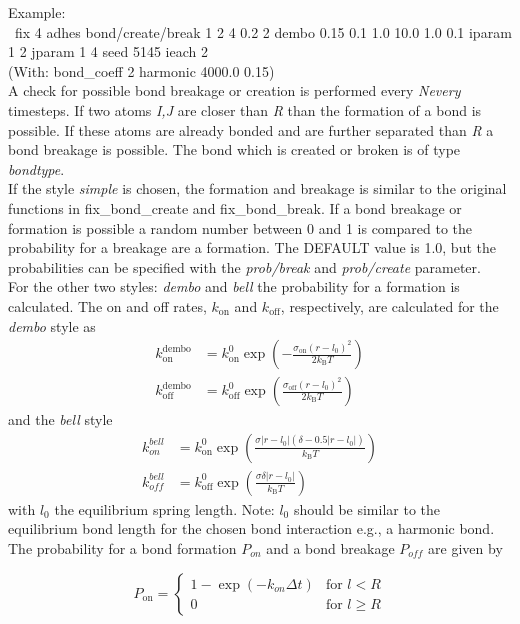 Example:\\[0.5ex]
\
fix             4 adhes bond/create/break 1 2 4 0.2 2 dembo 0.15 0.1 1.0 10.0 1.0 0.1 iparam 1 2 jparam 1 4 seed 5145 ieach 2\\
(With: bond\_coeff      2 harmonic 4000.0 0.15)
\\[3ex]
A check for possible bond breakage or creation is performed every \textit{Nevery} timesteps. 
If two atoms \textit{I,J} are closer than \textit{R} than the formation of a bond is possible.
If these atoms are already bonded and are further separated than \textit{R} a bond breakage is possible.
The bond which is created or broken is of type \textit{bondtype}.
\\[2ex]
If the style \textit{simple} is chosen, the formation and breakage is similar to the original functions in fix\_bond\_create and fix\_bond\_break.
If a bond breakage or formation is possible a random number between 0 and 1 is compared to the probability for a breakage are a formation.
The DEFAULT value is 1.0, but the probabilities can be specified with the \textit{prob/break} and \textit{prob/create} parameter.
\\[2ex]
For the other two styles: \textit{dembo} and \textit{bell} the probability for a formation is calculated.
The on and off rates, $k_\mathrm{on}$ and $k_\mathrm{off}$, respectively, are calculated for the \textit{dembo} style as
\begin{align}
	k_\mathrm{on}^\mathrm{dembo} &= k_\mathrm{on}^0 \exp\left( -\frac{\sigma_\mathrm{on} (r - l_0)^2}{2 k_\mathrm{B} T}  \right)\\
  k_\mathrm{off}^\mathrm{dembo} &= k_\mathrm{off}^0 \exp\left( \frac{\sigma_\mathrm{off} (r - l_0)^2}{2 k_\mathrm{B} T}  \right)
\end{align}
and the \textit{bell} style
\begin{align}
	k_{on}^{bell} &= k_\mathrm{on}^0 \exp\left( \frac{ \sigma |r - l_0|(\delta - 0.5|r - l_0|) }{ k_\mathrm{B} T}  \right)\\
  k_{off}^{bell} &= k_\mathrm{off}^0 \exp\left( \frac{\sigma \delta |r - l_0|}{k_\mathrm{B} T}  \right)
\end{align}
with $l_0$ the equilibrium spring length.
Note: $l_0$ should be similar to the equilibrium bond length for the chosen bond interaction e.g., a harmonic bond.
\\[2ex]
The probability for a bond formation $P_{on}$ and a bond breakage $P_{off}$ are given by

\begin{equation}
P_\mathrm{on}  = 
\begin{cases}

1 - \exp(-k_{on}\Delta t) & \text{for } l < R\\
 0  & \text{for } l \ge R

\end{cases}
\end{equation}


